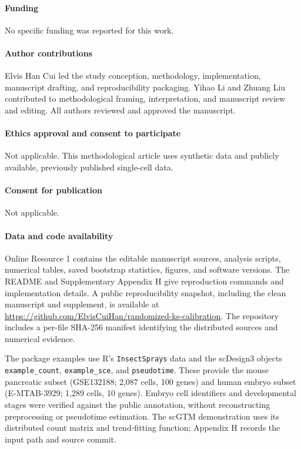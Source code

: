 \documentclass[preprint,12pt]{elsarticle}
\theoremstyle{plain}
\theoremstyle{remark}
\begin{document}
\paragraph{Funding}
No specific funding was reported for this work.

\paragraph{Author contributions}
Elvis Han Cui led the study conception, methodology, implementation,
manuscript drafting, and reproducibility packaging. Yihao Li and Zhuang Liu
contributed to methodological framing, interpretation, and manuscript review
and editing. All authors reviewed and approved the manuscript.

\paragraph{Ethics approval and consent to participate}
Not applicable. This methodological article uses synthetic data and publicly
available, previously published single-cell data.

\paragraph{Consent for publication}
Not applicable.

\paragraph{Data and code availability}
Online Resource 1 contains the editable manuscript sources, analysis scripts,
numerical tables, saved bootstrap statistics, figures, and software versions.
The README and Supplementary Appendix H give reproduction commands and
implementation details. A public reproducibility snapshot, including the
clean manuscript and supplement, is available at
\url{https://github.com/ElvisCuiHan/randomized-ks-calibration}.
The repository includes a per-file SHA-256 manifest identifying the
distributed sources and numerical evidence.

The package examples use R's \texttt{InsectSprays} data and the scDesign3
objects \texttt{example\_count}, \texttt{example\_sce}, and
\texttt{pseudotime}. These provide the mouse pancreatic subset (GSE132188;
2,087 cells, 100 genes) and human embryo subset (E-MTAB-3929; 1,289 cells,
10 genes). Embryo cell identifiers and developmental stages were verified
against the public annotation, without reconstructing preprocessing or
pseudotime estimation. The scGTM demonstration uses its distributed count
matrix and trend-fitting function; Appendix H records the input path and
source commit.
\end{document}
